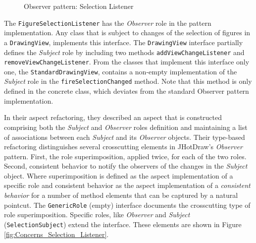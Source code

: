 \begin{figure}[H]
	\centering
  	\caption{Observer pattern: Selection Listener \cite{marin2005approach}}
  	\label{fig:Selection_Listener}
\end{figure}

The \texttt{FigureSelectionListener} has the \textit{Observer} role in the pattern implementation. 
Any class that is subject to changes of the selection of figures in a \texttt{DrawingView}, implements this interface. 
The \texttt{DrawingView} interface partially defines the \textit{Subject} role by including two methods \texttt{addViewChangeListener} and \texttt{removeViewChangeListener}.
From the classes that implement this interface only one, the \texttt{StandardDrawingView}, contains a non-empty implementation of the \textit{Subject} role in the \texttt{fireSelectionChanged} method.
Note that this method is only defined in the concrete class, which deviates from the standard Observer pattern implementation.

In their aspect refactoring, they described an aspect that is constructed comprising both the \textit{Subject} and \textit{Observer} roles definition and maintaining a list of associations between each \textit{Subject} and its \textit{Observer} objects.
Their type-based refactoring\cite{marin2005approach} distinguishes several crosscutting elements in JHotDraw's \textit{Observer} pattern. 
First, the role superimposition, applied twice, for each of the two roles. 
Second, consistent behavior to notify the observers of the changes in the \textit{Subject} object.
Where superimposition is defined as the aspect implementation of a specific role and consistent behavior as the aspect implementation of a \textit{consistent behavior} for a number of method elements that can be captured by a natural pointcut.
The \texttt{GenericRole} (empty) interface documents the crosscutting type of role superimposition. 
Specific roles, like \textit{Observer} and \textit{Subject} (\texttt{SelectionSubject}) extend the interface.
These elements are shown in Figure \ref{fig:Concerns_Selection_Listener}.

